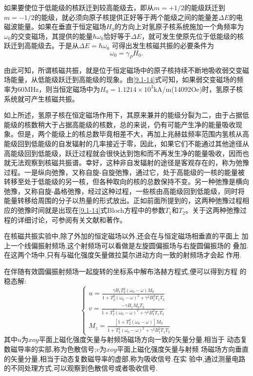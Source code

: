 \documentclass{buaaemp}
\begin{document}
如果要使位于低能级的核跃迁到较高能级去，即从$m=+1/2$的能级跃迁到$m=-1/2$的能级，就必须向原子核提供正好等于两个能级之间的能量差$\Delta E$的电磁波能量。如果在垂直于恒定磁场$H_0$的方向上对氢原子核系统施加一个角频率为$\omega_0$的交变磁场，其提供的能量$\hbar\omega_0$恰好等于$\Delta E$，就可发生使原先位于低能级的核跃迁到高能级去。于是从$\Delta E=\hbar\omega_0$
可得出发生核磁共振的必要条件为
\begin{equation}
\omega_0=\gamma_PH_0.\label{9.1-14}
\end{equation}

由此可知，所谓核磁共振，就是位于恒定磁场中的原子核持续不断地吸收弱交变磁场能量，从低能级跃迁到高能级的现象。由\ref{9.1-14}式可知，如果弱交变磁场的频率为60MHz，则当恒定磁场中为$H_0=1.1214\times 10^3$kA/m(14092Oe)时，氢原子核系统就可产生核磁共振。

如上所述，氢原子核在恒定磁场作用下，其原来兼并的能级分裂为二，由于占据低能级的核数稍大于占据高能级的核数，总的来说，仍有可能产生净的能量吸收现象。但是，两个能级上的核总数毕竟相差不大，再加上兆赫兹频率范围内氢核从高能级回到低能级的自发辐射的几率接近于零，因此，如果它们不能通过其他途径从高能级回到低能级，跃迁过程就会很快达到饱和而不再发生净的能量吸收，因而也就无法观察到核磁共振谱。幸好，这种非自发辐射的途径是客观存在的，称为弛豫过程。一是纵向弛豫，又称自旋-自旋弛豫，通过它，处于高能级的一核的能量被转移至处于低能级的另一核，但各种取向的核的总数保持不变。另一种弛豫是横向弛豫，又称自旋-晶格弛豫，经过这种过程，一些核由高能级回到低能级，同时将能量转移给周围的分子以热量的形式放出。正如前面所提到的，这两种弛豫过程相应的弛豫时间就是出现在\ref{9.1-14}式Bloch方程中的参数$T_1$和$T_2$。关于这两种弛豫过程的详细讨论，可参阅有关文献和著作。

在核磁共振实验中,除了外加的恒定磁场以外,还会在与恒定磁场相垂直的平面上
加上一个线偏振射频场,这个射频场可以看做是左旋圆偏振场与右旋圆偏振场的
叠加.在这两个场中,只有与磁化强度矢量做拉莫尔进动方向一致的射频场才会起
作用.

在伴随有效圆偏振射频场一起旋转的坐标系中解布洛赫方程式,便可以得到方程
的稳态解:
\begin{equation}
\begin{cases}
u = \frac{\gamma B_1 T^2_2(\omega_0 - \omega)M_0}{1 + T_2^2(\omega_0 -
  \omega)^2 + \gamma^2B_1^2T_1T_2}\\
v= \frac{-\gamma B_1 M_0T_2}{1 + T_2^2(\omega_0 -
  \omega)^2 + \gamma^2B_1^2T_1T_2} \\
M_z = \frac{\left[1 +T^2_2(\omega_0 - \omega) \right]M_0}{1 + T_2^2(\omega_0 -
  \omega)^2 + \gamma^2B_1^2T_1T_2}
\end{cases}
\end{equation}
其中$u$为$xoy$平面上磁化强度矢量与射频场磁场方向一致的矢量分量,相当于
动态复数磁导率的实部,称为色散信号;$v$为$xoy$平面上磁化强度矢量与射频
场磁场方向垂直的矢量分量,相当于动态复数磁导率的虚部,称为吸收信号.在实
验中,通过测量电路的不同处理方式,可以观察到色散信号或者吸收信号.
\end{document}
